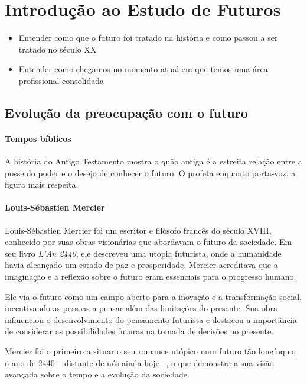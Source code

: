 \pagebreak
\section{Introdução ao Estudo de Futuros}

\begin{slidecontent}
\begin{itemize}[leftmargin=*]
    \item Entender como que o futuro foi tratado na história e como passou a ser tratado no século XX
    \item Entender como chegamos no momento atual em que temos uma área profissional consolidada
\end{itemize}
\end{slidecontent}

\subsection*{Evolução da preocupação com o futuro}


\paragraph{Tempos bíblicos}
A história do Antigo Testamento mostra o quão antiga é a estreita relação entre a posse do poder e o desejo de conhecer o futuro.
O profeta enquanto porta-voz, a figura mais respeita.

\paragraph{Louis-Sébastien Mercier}

Louis-Sébastien Mercier foi um escritor e filósofo francês do século XVIII, conhecido por suas obras visionárias que abordavam o futuro da sociedade. Em seu livro \textit{L'An 2440}, ele descreveu uma utopia futurista, onde a humanidade havia alcançado um estado de paz e prosperidade. Mercier acreditava que a imaginação e a reflexão sobre o futuro eram essenciais para o progresso humano.

Ele via o futuro como um campo aberto para a inovação e a transformação social, incentivando as pessoas a pensar além das limitações do presente. Sua obra influenciou o desenvolvimento do pensamento futurista e destacou a importância de considerar as possibilidades futuras na tomada de decisões no presente.

Mercier foi o primeiro a situar o seu romance utópico num futuro tão longínquo, o ano de 2440 -- distante de nós ainda hoje --, o que demonstra a sua visão avançada sobre o tempo e a evolução da sociedade.

